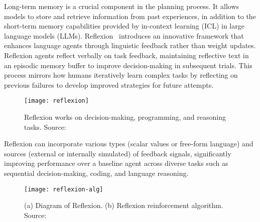 Long-term memory is a crucial component in the planning process. It allows models to store and retrieve information from past experiences, in addition to the short-term memory capabilities provided by in-context learning (ICL) in large language models (LLMs).
Reflexion~\cite{shinn2023reflexion} introduces an innovative framework that enhances language agents through linguistic feedback rather than weight updates.
Reflexion agents reflect verbally on task feedback, maintaining reflective text in an episodic memory buffer to improve decision-making in subsequent trials.
This process mirrors how humans iteratively learn complex tasks by reflecting on previous failures to develop improved strategies for future attempts.

\begin{figure}[h!]
	\centering
	\texttt{[image: reflexion]}
	\caption{Reflexion works on decision-making, programming, and reasoning tasks. Source: \textcite{shinn2023reflexion}}
	\label{fig:reflexion}
\end{figure}

Reflexion can incorporate various types (scalar values or free-form language) and sources (external or internally simulated) of feedback signals, significantly improving performance over a baseline agent across diverse tasks such as sequential decision-making, coding, and language reasoning.

\begin{figure}[h!]
	\centering
	\texttt{[image: reflexion-alg]}
	\caption{(a) Diagram of Reflexion. (b) Reflexion reinforcement algorithm. Source: \textcite{shinn2023reflexion}}
	\label{fig:reflexion-alg}
\end{figure}

